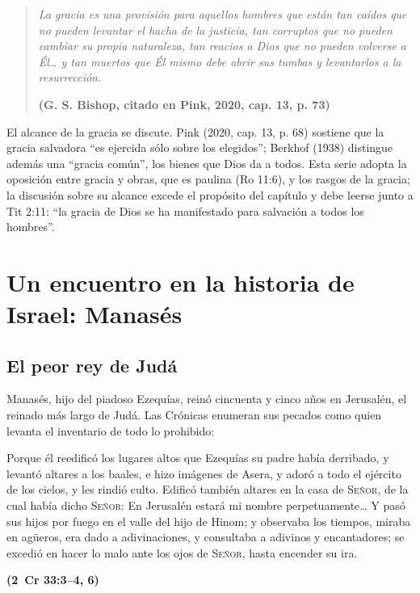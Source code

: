 \documentclass[11pt,letterpaper]{article}
\newcommand{\SENOR}{\textsc{Señor}}
\newcommand{\fuente}[1]{\par\hfill{\upshape\bfseries\small\textcolor{azul}{#1}}}
\begin{document}
\begin{quote}\itshape
La gracia es una provisión para aquellos hombres que están tan caídos que no pueden levantar el hacha de la justicia, tan corruptos que no pueden cambiar su propia naturaleza, tan reacios a Dios que no pueden volverse a Él\ldots{} y tan muertos que Él mismo debe abrir sus tumbas y levantarlos a la resurrección.\par\hfill{\upshape\small\bfseries\textcolor{azul}{(G. S. Bishop, citado en Pink, 2020, cap. 13, p. 73)}}
\end{quote}

\begin{nota}[Precisión]
El alcance de la gracia se discute. Pink (2020, cap. 13, p. 68) sostiene que la gracia salvadora ``es ejercida sólo sobre los elegidos''; Berkhof (1938) distingue además una ``gracia común'', los bienes que Dios da a todos. Esta serie adopta la oposición entre gracia y obras, que es paulina (Ro 11:6), y los rasgos de la gracia; la discusión sobre su alcance excede el propósito del capítulo y debe leerse junto a Tit 2:11: ``la gracia de Dios se ha manifestado para salvación a todos los hombres''.
\end{nota}

\section{Un encuentro en la historia de Israel: Manasés}

\subsection{El peor rey de Judá}
Manasés, hijo del piadoso Ezequías, reinó cincuenta y cinco años en Jerusalén, el reinado más largo de Judá. Las Crónicas enumeran sus pecados como quien levanta el inventario de todo lo prohibido:

\begin{cita}Porque él reedificó los lugares altos que Ezequías su padre había derribado, y levantó altares a los baales, e hizo imágenes de Asera, y adoró a todo el ejército de los cielos, y les rindió culto. Edificó también altares en la casa de \SENOR, de la cual había dicho \SENOR: En Jerusalén estará mi nombre perpetuamente\ldots{} Y pasó sus hijos por fuego en el valle del hijo de Hinom; y observaba los tiempos, miraba en agüeros, era dado a adivinaciones, y consultaba a adivinos y encantadores; se excedió en hacer lo malo ante los ojos de \SENOR, hasta encender su ira.\fuente{(2~Cr 33:3--4, 6)}\end{cita}
\end{document}
